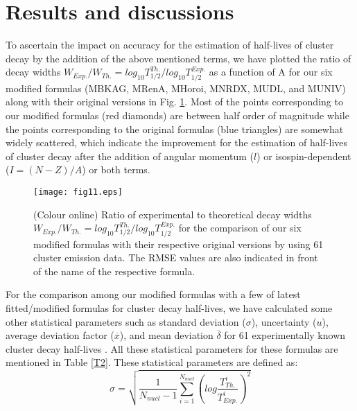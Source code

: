 \documentclass[preprint,10pt]{elsarticle}
\begin{document}
\section{Results and discussions}
To ascertain the impact on accuracy for the estimation of half-lives of cluster decay by the addition of the above mentioned terms, we have plotted the ratio of decay widths $W_{Exp.}/W_{Th.}=log_{10}T^{Th.}_{1/2}/log_{10}T^{Exp.}_{1/2}$ as a function of A for our six modified formulas (MBKAG, MRenA, MHoroi, MNRDX, MUDL, and MUNIV) along with their original versions in Fig. \ref{fig3}. Most of the points corresponding to our modified formulas (red diamonds) are between half order of magnitude while the points corresponding to the original formulas (blue triangles) are somewhat widely scattered, which indicate the improvement for the estimation of half-lives of cluster decay after the addition of angular momentum ($l$) or isospin-dependent ($I=(N-Z)/A$) or both terms.
\begin{figure}[!htbp]
\centering
\texttt{[image: fig11.eps]}
\caption{(Colour online) Ratio of experimental to theoretical decay widths $W_{Exp.}/W_{Th.}=log_{10}T^{Th.}_{1/2}/log_{10}T^{Exp.}_{1/2}$ for the comparison of our six modified formulas with their respective original versions by using 61 cluster emission data. The RMSE values are also indicated in front of the name of the respective formula.}\label{fig3}
\end{figure}

For the comparison among our modified formulas with a few of latest fitted/modified formulas \cite{Soylu2021,Ismail2022,cheng2022} for cluster decay half-lives, we have calculated some other statistical parameters such as standard deviation ($\sigma$), uncertainty ($u$), average deviation factor ($\overline{x}$), and mean deviation $\overline{\delta}$ for 61 experimentally known cluster decay half-lives \cite{Bonetti2007,Price1989,Royer2001,Soylu2021}. All these statistical parameters for these formulas are mentioned in Table \ref{T2}. These statistical parameters are defined as:
\begin{equation}
\sigma = \sqrt{\frac{1}{N_{nucl}-1}\sum^{N_{nucl}}_{i=1}\left(log\frac{T^i_{Th.}}{T^i_{Exp.}}\right)^2}
\end{equation}
\end{document}
